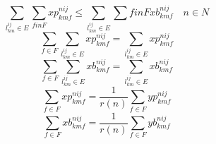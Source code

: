 \documentclass[a4j,twocolumn,fleqn]{jarticle}
\begin{document}
\begin{equation}
\sum_{l^{ij}_{km}\in E}\sum_{f in F}xp^{nij}_{kmf} \leq \sum_{l^{ij}_{km}\in E}\sum{f in F}xb^{nij}_{kmf}\quad n \in N
\end{equation}
\begin{equation}
\sum_{f \in F}\sum_{l^{ij}_{km}\in E}xp^{nij}_{kmf}=\sum_{l^{ij}_{km} \in E}xp^{nij}_{kmf}
\end{equation}
\begin{equation}
\sum_{f \in F}\sum_{l^{ij}_{km}\in E}xb^{nij}_{kmf}=\sum_{l^{ij}_{km} \in E}xb^{nij}_{kmf}
\end{equation}
\begin{equation}
\sum_{f \in F}xp^{nij}_{kmf} = \frac{1}{r(n)}\sum_{f\in F}yp^{nij}_{kmf}
\end{equation}
\begin{equation}
\sum_{f \in F}xb^{nij}_{kmf} = \frac{1}{r(n)}\sum_{f\in F}yb^{nij}_{kmf}
\end{equation}
\end{document}
